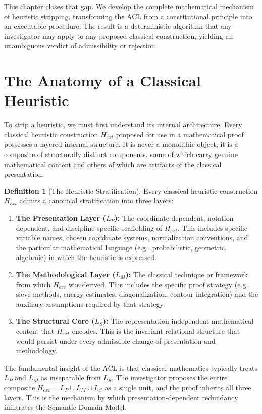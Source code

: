 \documentclass[12pt,openany]{extbook}
\theoremstyle{plain}
\theoremstyle{definition}
\newtheorem{definition}{Definition}[chapter]
\begin{document}
This chapter closes that gap. We develop the complete mathematical mechanism of heuristic stripping, transforming the ACL from a constitutional principle into an executable procedure. The result is a deterministic algorithm that any investigator may apply to any proposed classical construction, yielding an unambiguous verdict of admissibility or rejection.

\section{The Anatomy of a Classical Heuristic}

To strip a heuristic, we must first understand its internal architecture. Every classical heuristic construction $H_{ext}$ proposed for use in a mathematical proof possesses a layered internal structure. It is never a monolithic object; it is a composite of structurally distinct components, some of which carry genuine mathematical content and others of which are artifacts of the classical presentation.

\begin{definition}[The Heuristic Stratification]
Every classical heuristic construction $H_{ext}$ admits a canonical stratification into three layers:
\begin{enumerate}
    \item \textbf{The Presentation Layer ($L_P$):} The coordinate-dependent, notation-dependent, and discipline-specific scaffolding of $H_{ext}$. This includes specific variable names, chosen coordinate systems, normalization conventions, and the particular mathematical language (e.g., probabilistic, geometric, algebraic) in which the heuristic is expressed.
    \item \textbf{The Methodological Layer ($L_M$):} The classical technique or framework from which $H_{ext}$ was derived. This includes the specific proof strategy (e.g., sieve methods, energy estimates, diagonalization, contour integration) and the auxiliary assumptions required by that strategy.
    \item \textbf{The Structural Core ($L_S$):} The representation-independent mathematical content that $H_{ext}$ encodes. This is the invariant relational structure that would persist under every admissible change of presentation and methodology.
\end{enumerate}
\end{definition}

The fundamental insight of the ACL is that classical mathematics typically treats $L_P$ and $L_M$ as inseparable from $L_S$. The investigator proposes the entire composite $H_{ext} = L_P \cup L_M \cup L_S$ as a single unit, and the proof inherits all three layers. This is the mechanism by which presentation-dependent redundancy infiltrates the Semantic Domain Model.
\end{document}
